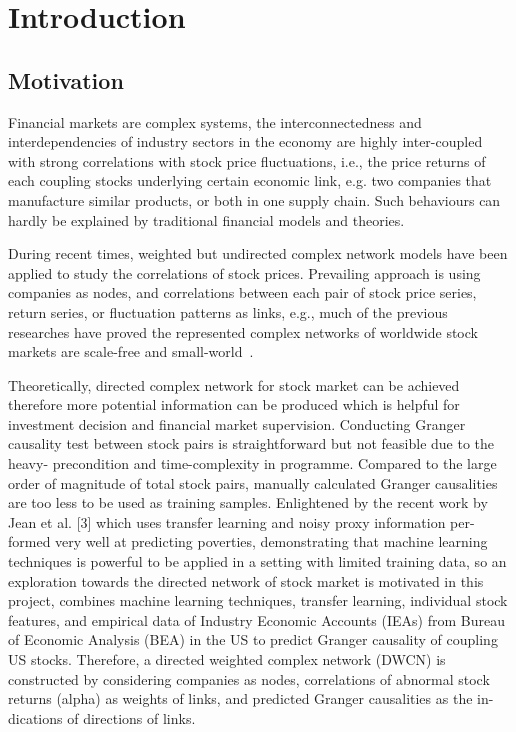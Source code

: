 \chapter{Introduction}
\section{Motivation}
Financial markets are complex systems, the interconnectedness and interdependencies of industry sectors in the economy are highly inter-coupled with strong correlations with stock price fluctuations, i.e., the price returns of each coupling stocks underlying certain economic link, e.g. two companies that manufacture similar products, or both in one supply chain. Such behaviours can hardly be explained by traditional financial models and theories.

During recent times, weighted but undirected complex network models have been applied to study the correlations of stock prices. Prevailing approach is using companies as nodes, and correlations between each pair of stock price series, return series, or fluctuation patterns as links, e.g., much of the previous researches have proved the represented complex networks of worldwide stock markets are scale-free and small-world~\cite{cnsm, perspective}.

Theoretically, directed complex network for stock market can be achieved therefore more potential information can be produced which is helpful for investment decision and financial market supervision. Conducting Granger causality test between stock pairs is straightforward but not feasible due to the heavy- precondition and time-complexity in programme. Compared to the large order of magnitude of total stock pairs, manually calculated Granger causalities are too less to be used as training samples. Enlightened by the recent work by Jean et al. [3] which uses transfer learning and noisy proxy information per- formed very well at predicting poverties, demonstrating that machine learning techniques is powerful to be applied in a setting with limited training data, so an exploration towards the directed network of stock market is motivated in this project, combines machine learning techniques, transfer learning, individual stock features, and empirical data of Industry Economic Accounts (IEAs) from Bureau of Economic Analysis (BEA) in the US to predict Granger causality of coupling US stocks. Therefore, a directed weighted complex network (DWCN) is constructed by considering companies as nodes, correlations of abnormal stock returns (alpha) as weights of links, and predicted Granger causalities as the in- dications of directions of links.

